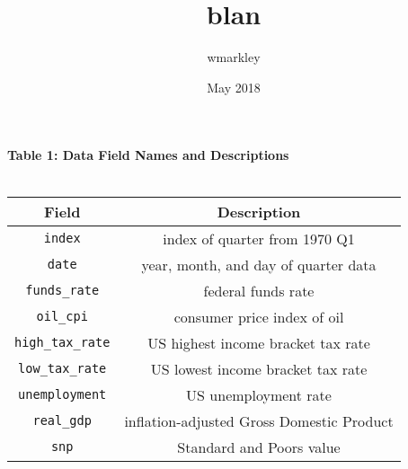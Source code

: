 \documentclass{article}
\title{blan}
\author{wmarkley }
\date{May 2018}
\begin{document}
\begin{center}

\textbf{Table 1: Data Field Names and Descriptions} \\
\textbf{ } \\

\begin{tabular}{ c|c }
\hline
 \textbf{Field} & \textbf{Description} \\ 
 \hline
 \verb|index|         & index of quarter from 1970 Q1 \\ 
 \verb|date|          & year, month, and day of quarter data \\
 \verb|funds_rate|    & federal funds rate \\
 \verb|oil_cpi|       & consumer price index of oil\\
 \verb|high_tax_rate| & US highest income bracket tax rate \\
 \verb|low_tax_rate|  & US lowest income bracket tax rate \\
 \verb|unemployment|  & US unemployment rate \\
 \verb|real_gdp|      & inflation-adjusted Gross Domestic Product \\
 \verb|snp|           & Standard and Poors value \\
\end{tabular}
\end{center}
\end{document}
